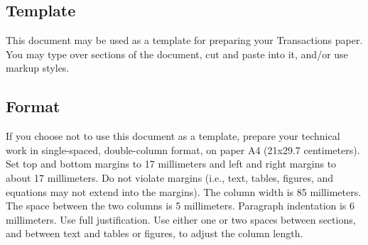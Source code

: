 \documentclass[a4paper]{IEEEtran}
\begin{document}
\subsection{Template}                  
This document may be used as a template for preparing your Transactions paper. You may type over sections of the document,
cut and paste into it, and/or use markup styles.
\subsection{Format}
If you choose not to use this document as a template, prepare your technical work in single-spaced, double-column format, on paper A4 (21x29.7 centimeters). 
Set top and bottom margins to 17 millimeters and left and right margins to about 17 millimeters. Do not violate margins 
(i.e., text, tables, figures, and equations may not extend into the margins). 
The column width is 85 millimeters. The space between the two columns is 5 millimeters. Paragraph indentation is 6 millimeters. Use full justification. 
Use either one or two spaces between sections, and between text and tables or figures, to adjust the column length.
\end{document}
